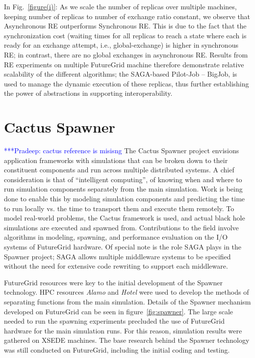 \documentclass[]{paper}
\newcommand{\pmnote}[1]{ {\textcolor{blue} { ***Pradeep: #1 }}}
\newcommand{\mrnote}[1]{ {\textcolor{cyan} { ***Melissa: #1 }}}
\newcommand{\pmnote}[1]{}
\newcommand{\mrnote}[1]{}
\begin{document}
In Fig.~\ref{figure(i)}: As we scale the number of replicas over multiple machines, keeping number of replicas to number of exchange ratio constant, we observe that Asynchronous RE outperforms Synchronous RE. This is due to the fact that the synchronization cost (waiting times for all replicas to reach a state where each is ready for an exchange attempt, i.e., global-exchange) is higher in synchronous RE; in contrast, there are no global exchanges in asynchronous RE.  Results from RE experiments on multiple FutureGrid machine therefore demonstrate relative scalability of the different algorithms; the SAGA-based Pilot-Job -- BigJob, is used to manage the dynamic execution of these replicas, thus further establishing the power of abstractions in supporting interoperability.


\section{Cactus Spawner}
\pmnote{cactus reference is misisng}
The Cactus Spawner project envisions application frameworks with simulations that can be broken down to their constituent components and run across multiple distributed systems.  A chief consideration is that of ``intelligent computing'', of knowing when and where to run simulation components separately from the main simulation.  Work is being done to enable this by modeling simulation components and predicting the time to run locally vs. the time to transport them and execute them remotely.  To model real-world problems, the Cactus framework is used, and actual black hole simulations are executed and spawned from.  Contributions to the field involve algorithms in modeling, spawning, and performance evaluation on the I/O systems of FutureGrid hardware.  Of special note is the role SAGA plays in the Spawner project; SAGA allows multiple middleware systems to be specified without the need for extensive code rewriting to support each middleware.

FutureGrid resources were key to the initial development of the Spawner technology.  HPC resources \textit{Alamo} and \textit{Hotel} were used to develop the methods of separating functions from the main simulation. Details of the Spawner mechanism developed on FutureGrid can be seen in figure~\ref{fig:spawner}.  The large scale needed to run the spawning experiments precluded the use of FutureGrid hardware for the main simulation runs.  For this reason, simulation results were gathered on XSEDE machines.  The base research behind the Spawner technology was still conducted on FutureGrid, including the initial coding and testing.
\end{document}
